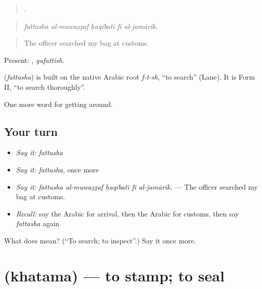 \begin{quote}
    .
\end{quote}

\begin{quote}
\emph{fattasha al-muwaẓẓaf ḥaqībatī fī al-jamārik.}
\end{quote}

\begin{quote}
The officer searched my bag at customs.
\end{quote}

Present: , \emph{yufattish}.

\begin{cousinweb}
\textbf{} (\emph{fattasha}) is built on the native Arabic root \emph{f-t-sh}, \textquotedblleft{}to search\textquotedblright{} (Lane). It is Form II, \textquotedblleft{}to search thoroughly\textquotedblright{}.
\end{cousinweb}

\begin{grammarlens}[title={What you've built}]
One more word for getting around.
\end{grammarlens}

\subsection*{Your turn}
\begin{itemize}
\raggedright
  \item \emph{Say it:} \emph{fattasha}
  \item \emph{Say it:} \emph{fattasha}, once more
  \item \emph{Say it:} \emph{fattasha al-muwaẓẓaf ḥaqībatī fī al-jamārik.} — The officer searched my bag at customs.
  \item \emph{Recall:} say the Arabic for arrival, then the Arabic for customs, then say \emph{fattasha} again
\end{itemize}

\begin{tcolorbox}[breakable,colback=teal!4,colframe=teal!35!black,title={Before you move on}]
What does  mean? (\textquotedblleft{}To search; to inspect\textquotedblright{}.) Say it once more.
\end{tcolorbox}
\section[\texorpdfstring{\ar{ختم} (khatama)}{ختم (khatama)}]{ (khatama) — to stamp; to seal}

